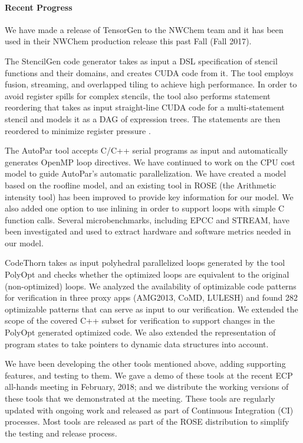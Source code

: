 \paragraph{Recent Progress}

We have made a release of TensorGen to the NWChem team and it has been used in their NWChem production 
release this past Fall (Fall 2017).

The StencilGen code generator takes as input a DSL specification of stencil functions and their domains, and 
creates CUDA code from it. The tool employs fusion, streaming, and overlapped tiling to achieve high performance. 
In order to avoid register spills for complex stencils, the tool also performs statement reordering that takes as 
input straight-line CUDA code for a multi-statement stencil and models it as a DAG of expression trees. The 
statements are then reordered to minimize register pressure \cite{PPoPP18}.

The AutoPar tool accepts C/C++ serial programs as input and automatically generates OpenMP loop directives. We 
have continued to work on the CPU cost model to guide AutoPar’s automatic parallelization. We have created a model 
based on the roofline model, and an existing tool in ROSE (the Arithmetic intensity tool) has been improved to 
provide key information for our model. We also added one option to use inlining in order to support loops with 
simple C function calls.  Several microbenchmarks, including EPCC and STREAM, have been investigated and used 
to extract hardware and software metrics needed in our model.

CodeThorn takes as input polyhedral parallelized loops generated by the tool PolyOpt and checks whether the 
optimized loops are equivalent to the original (non-optimized) loops. We analyzed the availability of optimizable 
code patterns for verification in three proxy apps (AMG2013, CoMD, LULESH) and found 282 optimizable patterns 
that can serve as input to our verification. We extended the scope of the covered C++ subset for verification 
to support changes in the PolyOpt generated optimized code. We also extended the representation of program states 
to take pointers to dynamic data structures into account.

We have been developing the other tools mentioned above, adding supporting features, and testing to them.
We gave a demo of these tools at the recent ECP all-hands meeting in February, 2018; and we distribute 
the working versions of these tools that we demonstrated at the meeting.  These tools are regularly updated 
with ongoing work and released as part of Continuous Integration (CI) processes.  Most tools are released
as part of the ROSE distribution to simplify the testing and release process.

